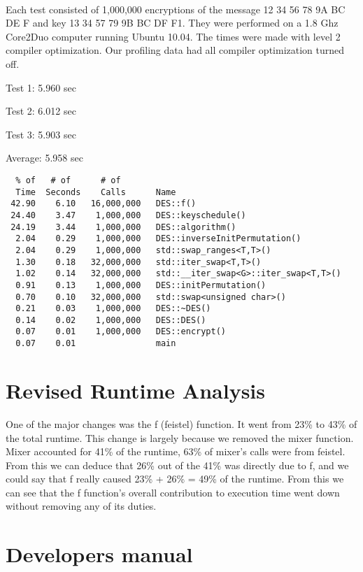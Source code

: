 \documentclass[10pt]{article}
\begin{document}
\paragraph{}Each test consisted of 1,000,000 encryptions of the message 12 34 56 78 9A BC DE F and key 13 34 57 79 9B BC DF F1. They were performed on a 1.8 Ghz Core2Duo computer running Ubuntu 10.04. The times were made with level 2 compiler optimization. Our profiling data had all compiler optimization turned off.
\begin{multicols}{4}
Test 1:  5.960 sec

Test 2:  6.012 sec

Test 3:  5.903 sec

Average: 5.958 sec
\end{multicols}
\begin{verbatim}
  % of   # of      # of
  Time  Seconds    Calls      Name
 42.90    6.10   16,000,000   DES::f()
 24.40    3.47    1,000,000   DES::keyschedule()
 24.19    3.44    1,000,000   DES::algorithm()
  2.04    0.29    1,000,000   DES::inverseInitPermutation()
  2.04    0.29    1,000,000   std::swap_ranges<T,T>()
  1.30    0.18   32,000,000   std::iter_swap<T,T>()
  1.02    0.14   32,000,000   std::__iter_swap<G>::iter_swap<T,T>()
  0.91    0.13    1,000,000   DES::initPermutation()
  0.70    0.10   32,000,000   std::swap<unsigned char>()
  0.21    0.03    1,000,000   DES::~DES()
  0.14    0.02    1,000,000   DES::DES()
  0.07    0.01    1,000,000   DES::encrypt()
  0.07    0.01                main
\end{verbatim}

\section{Revised Runtime Analysis}
  One of the major changes was the f (feistel) function. It went from 23\% to 43\% of the total runtime.  This change is largely because we removed the mixer function. Mixer accounted for 41\% of the runtime, 63\% of mixer's calls were from feistel.  From this we can deduce that 26\% out of the 41\% was directly due to f, and we could say that f really caused 23\% + 26\% = 49\% of the runtime.  From this we can see that the f function's overall contribution to execution time went down without removing any of its duties. 

\pagebreak
\section{Developers manual}
\end{document}
